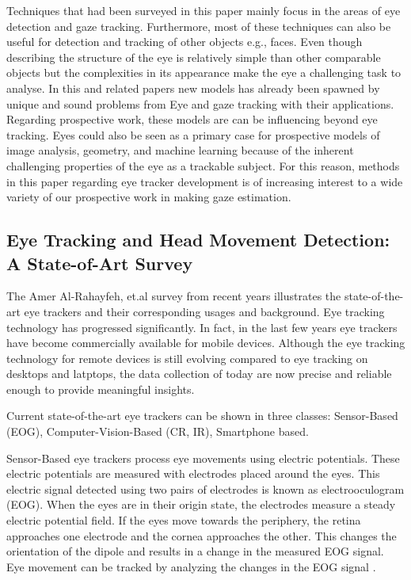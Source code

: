 Techniques that had been surveyed in this paper mainly focus in the areas of eye detection and gaze tracking. Furthermore, most of these techniques can also be useful for detection and tracking of other objects e.g., faces. Even though describing the structure of the eye is relatively simple than other comparable objects but the complexities in its appearance make the eye a challenging task to analyse. In this and related papers new models has already been spawned by unique and sound problems from Eye and gaze tracking with their applications. \\

Regarding prospective work, these models are can be influencing beyond eye tracking. Eyes could also be seen as a primary case for prospective models of image analysis, geometry, and machine learning because of the inherent challenging properties of the eye as a trackable subject. For this reason, methods in this paper regarding eye tracker development is of increasing interest to a wide variety of our prospective work in making gaze estimation.

\subsection{Eye Tracking and Head Movement Detection: A State-of-Art Survey}

The Amer Al-Rahayfeh, et.al \cite{3} survey from recent years illustrates the state-of-the-art eye trackers and their corresponding usages and background. Eye tracking technology has progressed significantly. In fact, in the last few years eye trackers have become commercially available for mobile devices. Although the eye tracking technology for remote devices is still evolving compared to eye tracking on desktops and latptops, the data collection of today are now precise and reliable enough to provide meaningful insights.

Current state-of-the-art eye trackers can be shown in three classes: Sensor-Based (EOG), Computer-Vision-Based (CR, IR), Smartphone based.

Sensor-Based eye trackers process eye movements using electric potentials. These electric potentials are measured with electrodes placed around the eyes. This electric signal detected using two pairs of electrodes is known as electrooculogram (EOG). When the eyes are in their origin state, the electrodes measure a steady electric potential field. If the eyes move towards the periphery, the retina approaches one electrode and the cornea approaches the other. This changes the orientation of the dipole and results in a change in the measured EOG signal. Eye movement can be tracked by analyzing the changes in the EOG signal \cite{9}.


